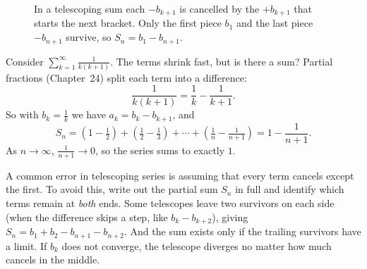 \begin{figure}[htbp]
\centering
{}
\caption{In a telescoping sum each $-b_{k+1}$ is cancelled by the $+b_{k+1}$ that starts the next bracket. Only the first piece $b_1$ and the last piece $-b_{n+1}$ survive, so $S_n = b_1 - b_{n+1}$.}
\label{ch29:fig-telescope}
\end{figure}

\begin{example}
Consider $\displaystyle\sum_{k=1}^{\infty} \frac{1}{k(k+1)}$. The terms shrink fast, but is there a sum? Partial fractions (Chapter~24) split each term into a difference:
\[
\frac{1}{k(k+1)} = \frac{1}{k} - \frac{1}{k+1}.
\]
So with $b_k = \tfrac1k$ we have $a_k = b_k - b_{k+1}$, and
\[
S_n = \left(1 - \tfrac12\right) + \left(\tfrac12 - \tfrac13\right) + \cdots + \left(\tfrac1n - \tfrac{1}{n+1}\right) = 1 - \frac{1}{n+1}.
\]
As $n\to\infty$, $\tfrac{1}{n+1}\to 0$, so the series sums to exactly $1$.
\end{example}

\begin{trapbox}
A common error in telescoping series is assuming that every term cancels except the first. To avoid this, write out the partial sum $S_n$ in full and identify which terms remain at \emph{both} ends. Some telescopes leave two survivors on each side (when the difference skips a step, like $b_k - b_{k+2}$), giving $S_n = b_1 + b_2 - b_{n+1} - b_{n+2}$. And the sum exists only if the trailing survivors have a limit. If $b_k$ does not converge, the telescope diverges no matter how much cancels in the middle.
\end{trapbox}

